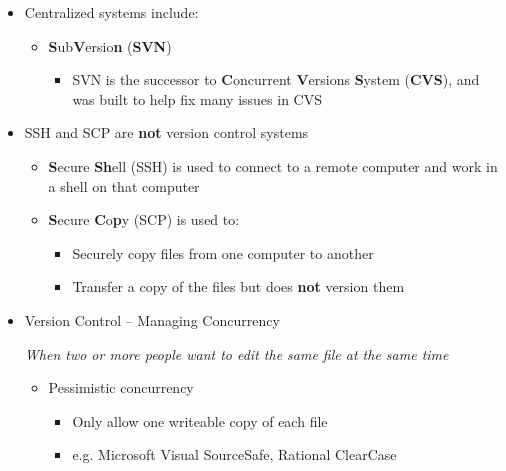 \begin{itemize}
		\item Centralized systems include:
		\begin{itemize}
			\item \textbf{S}ub\textbf{V}ersio\textbf{n} (\textbf{SVN})
			\begin{itemize}
				\item SVN is the successor to \textbf{C}oncurrent \textbf{V}ersions \textbf{S}ystem (\textbf{CVS}), and was built to help fix many issues in CVS
			\end{itemize}
		\end{itemize}

		\item SSH and SCP are \textbf{not} version control systems
		\begin{itemize}
			\item \textbf{S}ecure \textbf{Sh}ell (SSH) is used to connect to a remote computer and work in a shell on that computer
			\item \textbf{S}ecure \textbf{C}o\textbf{p}y (SCP) is used to:
			\begin{itemize}
				\item Securely copy files from one computer to another
				\item Transfer a copy of the files but does \textbf{not} version them
			\end{itemize}
		\end{itemize}

		\item Version Control – Managing Concurrency

		\emph{When two or more people want to edit the same file at the same time}
		\begin{itemize}
			\item Pessimistic concurrency
			\begin{itemize}
				\item Only allow one writeable copy of each file
				\item e.g. Microsoft Visual SourceSafe, Rational ClearCase
			\end{itemize}


\end{itemize}
\end{itemize}
